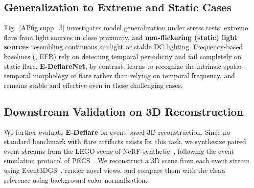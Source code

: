 \subsection{Generalization to Extreme and Static Cases}

Fig.~\ref{APfig:supp_3} investigates model generalization under stress tests: extreme flare from light sources in close proximity, and \textbf{non-flickering (static) light sources} resembling continuous sunlight or stable DC lighting. Frequency-based baselines (\eg, EFR) rely on detecting temporal periodicity and fail completely on static flare. \textbf{E-DeflareNet}, by contrast, learns to recognize the intrinsic spatio-temporal morphology of flare rather than relying on temporal frequency, and remains stable and effective even in these challenging cases.


\subsection{Downstream Validation on 3D Reconstruction}
\label{app:3d_reconstruction}

We further evaluate \textbf{E-Deflare} on event-based 3D reconstruction. Since no standard benchmark with flare artifacts exists for this task, we synthesize paired event streams from the LEGO scene of NeRF-synthetic~\cite{mildenhall2021nerf}, following the event simulation protocol of PECS~\cite{han2024physical}. We reconstruct a 3D scene from each event stream using Event3DGS~\cite{han2024event}, render novel views, and compare them with the clean reference using background color normalization.

\begin{table}[H]
    \centering
    \caption{\textbf{Downstream task comparisons} for event-based 3D reconstruction. We use Event3DGS~\cite{han2024event} to reconstruct scenes and evaluate novel view synthesis. $\uparrow$: higher is better.}
    \label{tab:app_3dgs_quant}
    \small
\end{table}

